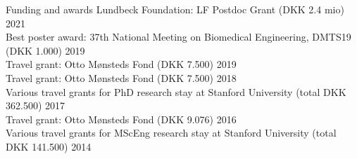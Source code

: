\documentclass{resume} %
\begin{document}

\begin{rSection}{Funding and awards}
    Lundbeck Foundation: LF Postdoc Grant (DKK 2.4 mio) \hfill {2021} \\
    Best poster award: 37th National Meeting on Biomedical Engineering, DMTS19 (DKK 1.000) \hfill {2019} \\
    Travel grant: Otto Mønsteds Fond (DKK 7.500) \hfill {2019} \\
    Travel grant: Otto Mønsteds Fond (DKK 7.500) \hfill {2018} \\ 
    Various travel grants for PhD research stay at Stanford University (total DKK 362.500) \hfill {2017} \\
    Travel grant: Otto Mønsteds Fond (DKK 9.076) \hfill {2016} \\ 
    Various travel grants for MScEng research stay at Stanford University (total DKK 141.500) \hfill {2014} \\
    

    

\end{rSection}
\end{document}
